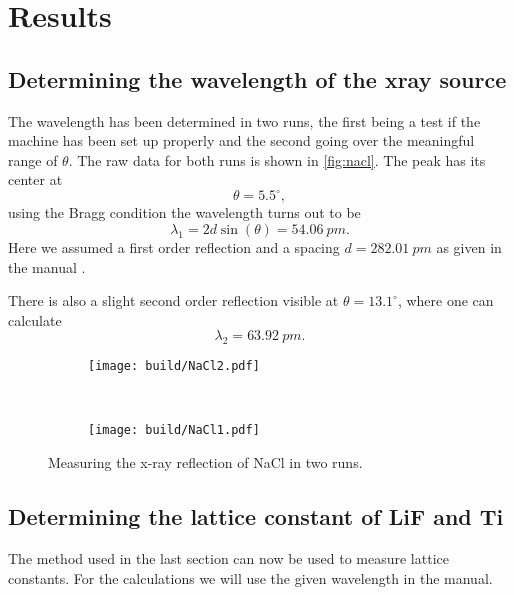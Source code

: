 \section{Results}
\label{sec:results}

\subsection{Determining the wavelength of the xray source}
\label{sec:res:wavelength}
The wavelength has been determined in two runs, the first being a test if the machine has been set
up properly and the second going over the meaningful range of $\theta$. The raw data for both runs
is shown in \autoref{fig:nacl}. The peak has its center at
\[
  \theta = 5.5^\circ,
\]
using the Bragg condition the wavelength turns out to be
\begin{equation}
  \lambda_1 = 2d \sin(\theta) = \SI{54.06}{pm}.
\end{equation}
Here we assumed a first order reflection and a spacing $d = \SI{282.01}{pm}$ as given in the manual
\cite{leybold_manual1}.

There is also a slight second order reflection visible at $\theta = 13.1^\circ$, where one can
calculate
\begin{equation}
  \lambda_2 = \SI{63.92}{pm}.
\end{equation}

\begin{figure}
  \centering
  \begin{subfigure}[b]{0.45\textwidth}
    \centering
    \texttt{[image: build/NaCl2.pdf]}
    \label{fig:nacl_calib}
  \end{subfigure}
  \\
  \begin{subfigure}[b]{0.45\textwidth}
    \centering
    \texttt{[image: build/NaCl1.pdf]}
    \label{fig:nacl}
  \end{subfigure}
  \caption{Measuring the x-ray reflection of NaCl in two runs.}
  \label{fig:nacl}
\end{figure}

\subsection{Determining the lattice constant of LiF and Ti}
\label{sec:res:d}
The method used in the last section can now be used to measure lattice constants. For the
calculations we will use the given wavelength in the manual. 

